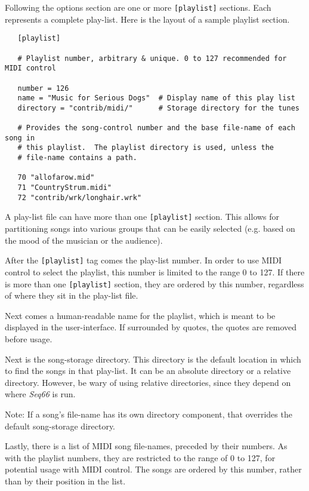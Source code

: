    Following the options section are one or more \texttt{[playlist]} sections.
   Each represents a complete play-list.
   Here is the layout of a sample playlist section.

   \begin{verbatim}
   [playlist]

   # Playlist number, arbitrary & unique. 0 to 127 recommended for MIDI control

   number = 126
   name = "Music for Serious Dogs"  # Display name of this play list
   directory = "contrib/midi/"      # Storage directory for the tunes

   # Provides the song-control number and the base file-name of each song in
   # this playlist.  The playlist directory is used, unless the
   # file-name contains a path.

   70 "allofarow.mid"
   71 "CountryStrum.midi"
   72 "contrib/wrk/longhair.wrk"
   \end{verbatim}

   A play-list file can have more than one \texttt{[playlist]} section.  This
   allows for partitioning songs into various groups that can be easily
   selected (e.g. based on the mood of the musician or the audience).

   After the \texttt{[playlist]} tag comes the play-list number.
   In order to use MIDI control to select the playlist, this number
   is limited to the range 0 to 127.
   If there is more than one \texttt{[playlist]} section, they are ordered by
   this number, regardless of where they sit in the play-list file.

   Next comes a human-readable name for the playlist, which is meant to be
   displayed in the user-interface.  If surrounded by quotes, the quotes are
   removed before usage.

   Next is the song-storage directory.
   This directory is the default location in which to find the songs
   in that play-list.
   It can be an absolute directory or a relative directory.
   However, be wary of using relative directories, since they depend on where
   \textsl{Seq66} is run.

   Note: If a song's file-name has its own directory component, that overrides
   the default song-storage directory.

   Lastly, there is a list of MIDI song file-names, preceded by their numbers.
   As with the playlist numbers, they are restricted to the range of 0 to
   127, for potential usage with MIDI control.
   The songs are ordered by this number,
   rather than by their position in the list.

